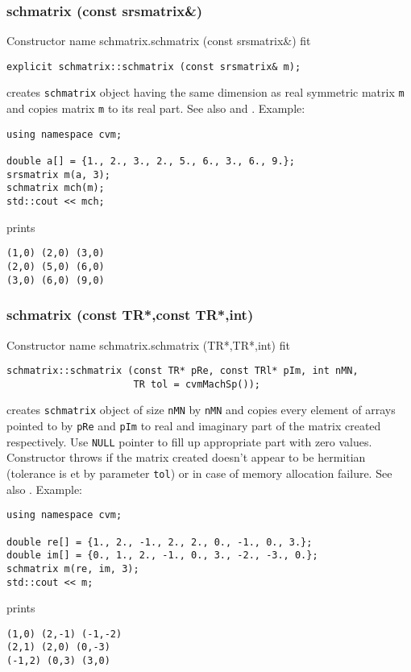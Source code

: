 \subsubsection{schmatrix (const srsmatrix\&)}
Constructor%
\pdfdest name {schmatrix.schmatrix (const srsmatrix&)} fit
\begin{verbatim}
explicit schmatrix::schmatrix (const srsmatrix& m);
\end{verbatim}
creates  \verb"schmatrix" object
having the same dimension as real symmetric matrix \verb"m"
and copies  matrix \verb"m" to its real part.
See also  and 
.
Example:
\begin{Verbatim}
using namespace cvm;

double a[] = {1., 2., 3., 2., 5., 6., 3., 6., 9.};
srsmatrix m(a, 3);
schmatrix mch(m);
std::cout << mch;
\end{Verbatim}
prints
\begin{Verbatim}
(1,0) (2,0) (3,0)
(2,0) (5,0) (6,0)
(3,0) (6,0) (9,0)
\end{Verbatim}
\newpage




\subsubsection{schmatrix (const TR*,const TR*,int)}
Constructor%
\pdfdest name {schmatrix.schmatrix (TR*,TR*,int)} fit
\begin{verbatim}
schmatrix::schmatrix (const TR* pRe, const TRl* pIm, int nMN,
                      TR tol = cvmMachSp());
\end{verbatim}
creates  \verb"schmatrix" object
of size \verb"nMN" by \verb"nMN" and copies every
element of arrays pointed to by \verb"pRe" and \verb"pIm"
to  real and imaginary part of the matrix created respectively.
Use \verb"NULL" pointer to fill up appropriate
part with zero values.
Constructor throws  
if the matrix created doesn't appear to be hermitian (tolerance is et by parameter \verb'tol')
or in case of memory allocation failure.
See also .
Example:
\begin{Verbatim}
using namespace cvm;

double re[] = {1., 2., -1., 2., 2., 0., -1., 0., 3.};
double im[] = {0., 1., 2., -1., 0., 3., -2., -3., 0.};
schmatrix m(re, im, 3);
std::cout << m;
\end{Verbatim}
prints
\begin{Verbatim}
(1,0) (2,-1) (-1,-2)
(2,1) (2,0) (0,-3)
(-1,2) (0,3) (3,0)
\end{Verbatim}
\newpage





